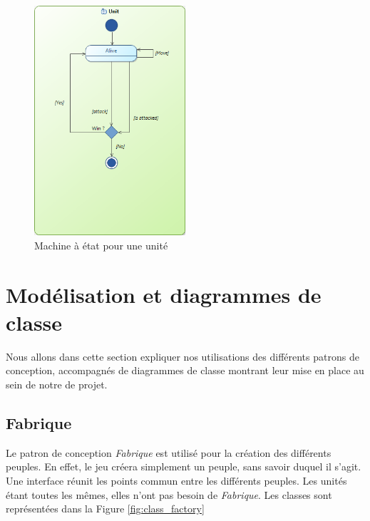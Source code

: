 \documentclass[a4paper]{article}
\begin{document}
\begin{figure}[ht]
\centering
	\includegraphics[width=0.5\textwidth, height=0.4\textheight]{../Schemas/machine_etat_unite.png}
		\caption{Machine à état pour une unité}
		\label{fig:machine_unite}
\end{figure}

\clearpage
\section{Modélisation et diagrammes de classe}
Nous allons dans cette section expliquer nos utilisations des différents patrons de conception, accompagnés de diagrammes de classe montrant leur mise en place au sein de notre de projet.
	
	\subsection{Fabrique}
Le patron de conception \textit{Fabrique} est utilisé pour la création des différents peuples. En effet, le jeu créera simplement un peuple, sans savoir duquel il s'agit. Une interface réunit les points commun entre les différents peuples. Les unités étant toutes les mêmes, elles n'ont pas besoin de \textit{Fabrique}. Les classes sont représentées dans la Figure \ref{fig:class_factory}
\end{document}
